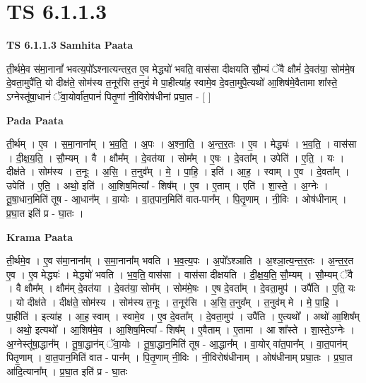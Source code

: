 \documentclass[17pt]{extarticle}
\begin{document}
\section{ TS 6.1.1.3 }

\textbf{TS 6.1.1.3 } \newline
\textbf{Samhita Paata} \newline

ती॒र्थमे॒व स॑मा॒नानां᳚ भवत्य॒पो᳚ऽश्नात्यन्तर॒त ए॒व मेद्ध्यो॑ भवति॒ वास॑सा दीक्षयति सौ॒म्यं ॅवै क्षौमं॑ दे॒वत॑या॒ सोम॑मे॒ष दे॒वता॒मुपै॑ति॒ यो दीक्ष॑ते॒ सोम॑स्य त॒नूर॑सि त॒नुवं॑ मे पा॒हीत्या॑ह॒ स्वामे॒व दे॒वता॒मुपै॒त्यथो॑ आ॒शिष॑मे॒वैतामा शा᳚स्ते॒ ऽग्नेस्तू॑षा॒धानं॑ ॅवा॒योर्वा॑त॒पानं॑ पितृ॒णां नी॒विरोष॑धीनां प्रघा॒त - [  ] \newline

\textbf{Pada Paata} \newline

ती॒र्थम् । ए॒व । स॒मा॒नाना᳚म् । भ॒व॒ति॒ । अ॒पः । अ॒श्ना॒ति॒ । अ॒न्त॒र॒तः । ए॒व । मेद्ध्यः॑ । भ॒व॒ति॒ । वास॑सा । दी॒क्ष॒य॒ति॒ । सौ॒म्यम् । वै । क्षौम᳚म् । दे॒वत॑या । सोम᳚म् । ए॒षः । दे॒वता᳚म् । उपेति॑ । ए॒ति॒ । यः । दीक्ष॑ते । सोम॑स्य । त॒नूः । अ॒सि॒ । त॒नुव᳚म् । मे॒ । पा॒हि॒ । इति॑ । आ॒ह॒ । स्वाम् । ए॒व । दे॒वता᳚म् । उपेति॑ । ए॒ति॒ । अथो॒ इति॑ । आ॒शिष॒मित्या᳚ - शिष᳚म् । ए॒व । ए॒ताम् । एति॑ । शा॒स्ते॒ । अ॒ग्नेः । तू॒षा॒धान॒मिति॑ तूष - आ॒धान᳚म् । वा॒योः । वा॒त॒पान॒मिति॑ वात-पान᳚म् । पि॒तृ॒णाम् । नी॒विः । ओष॑धीनाम् । प्र॒घा॒त इति॑ प्र - घा॒तः ।  \newline


\textbf{Krama Paata} \newline

ती॒र्थमे॒व । ए॒व स॑मा॒नाना᳚म् । स॒मा॒नाना᳚म् भवति । भ॒व॒त्य॒पः । अ॒पो᳚ऽश्ञाति । अ॒श्ञा॒त्य॒न्त॒र॒तः । अ॒न्त॒र॒त ए॒व । ए॒व मेद्ध्यः॑ । मेद्ध्यो॑ भवति । भ॒व॒ति॒ वास॑सा । वास॑सा दीक्षयति । दी॒क्ष॒य॒ति॒ सौ॒म्यम् । सौ॒म्यम् ॅवै । वै क्षौम᳚म् । क्षौम॑म् दे॒वत॑या । दे॒वत॑या॒ सोम᳚म् । सोम॑मे॒षः । ए॒ष दे॒वता᳚म् । दे॒वता॒मुप॑ । उपै॑ति । ए॒ति॒ यः । यो दीक्ष॑ते । दीक्ष॑ते॒ सोम॑स्य । सोम॑स्य त॒नूः । त॒नूर॑सि । अ॒सि॒ त॒नुव᳚म् । त॒नुव॑म् मे । मे॒ पा॒हि॒ । पा॒हीति॑ । इत्या॑ह । आ॒ह॒ स्वाम् । स्वामे॒व । ए॒व दे॒वता᳚म् । दे॒वता॒मुप॑ । उपै॑ति । ए॒त्यथो᳚ । अथो॑ आ॒शिष᳚म् । अथो॒ इत्यथो᳚ । आ॒शिष॑मे॒व । आ॒शिष॒मित्या᳚ - शिष᳚म् । ए॒वैताम् । ए॒तामा । आ शा᳚स्ते । शा॒स्ते॒ऽग्नेः । अ॒ग्नेस्तू॑षा॒द्धान᳚म् । तू॒षा॒द्धान॑म् ॅवा॒योः । तू॒षा॒द्धान॒मिति॑ तूष - आ॒द्धान᳚म् । वा॒योर् वा॑त॒पान᳚म् । वा॒त॒पान॑म् पितृ॒णाम् । वा॒त॒पान॒मिति॑ वात - पान᳚म् । पि॒तृ॒णाम् नी॒विः । नी॒विरोष॑धीनाम् । ओष॑धीनाम् प्रघा॒तः । प्र॒घा॒त आ॑दि॒त्याना᳚म् । प्र॒घा॒त इति॑ प्र - घा॒तः \newline
\end{document}
